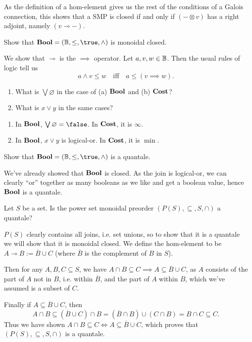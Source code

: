As the definition of a hom-element gives us the rest of the conditions of a Galois connection, this shows that a SMP is closed if and only if $(-\otimes v)$ has a right adjoint, namely $(v\multimap-)$.

Show that $\Bool=(\B,\leq,\true,\land)$ is monoidal closed.

\solution
We show that $\multimap$ is the $\implies$ operator.  Let $a,v,w\in\mathbb{B}$.  Then the usual rules of logic tell us
$$ a\land v\leq w \quad\textrm{iff}\quad a\leq (v\implies w).$$

\begin{enumerate}
	\item What is $\bigvee\varnothing$ in the case of (a) $\textbf{Bool}$ and (b) $\textbf{Cost}$?
	\item What is $x\lor y$ in the same cases?
\end{enumerate}

\solution
\begin{enumerate}
	\item In $\textbf{Bool}$, $\bigvee\varnothing=\false$.  In $\textbf{Cost}$, it is $\infty$.
	\item In $\textbf{Bool}$, $x\lor y$ is logical-or.  In $\textbf{Cost}$, it is $\min$.
\end{enumerate}

Show that $\Bool=(\B,\leq,\true,\land)$ is a quantale.

\solution
We've already showed that $\textbf{Bool}$ is closed.  As the join is logical-or, we can clearly ``or'' together as many booleans as we like and get a boolean value, hence $\textbf{Bool}$ is a quantale.

Let $S$ be a set.  Is the power set monoidal preorder $(P(S),\subseteq, S, \cap)$ a quantale?

\solution
$P(S)$ clearly contains all joins, i.e. set unions, so to show that it is a quantale we will show that it is monoidal closed.  We define the hom-element to be $A\multimap B := \overline B\cup C$ (where $\overline B$ is the complement of $B$ in $S$).

Then for any $A,B,C\subseteq S$, we have $A\cap B\subseteq C\implies A\subseteq \overline B\cup C$, as $A$ consists of the part of $A$ not in $B$, i.e. within $\overline B$, and the part of $A$ within $B$, which we've assumed is a subset of $C$. 

Finally if $A\subseteq \overline B\cup C$, then
$$A\cap B\subseteq (\overline B \cup C)\cap B=(\overline B\cap B)\cup(C \cap B)=B\cap C\subseteq C.$$
Thus we have shown $A\cap B\subseteq C\iff A\subseteq\overline B\cup C$, which proves that $(P(S),\subseteq, S, \cap)$ is a quantale.

